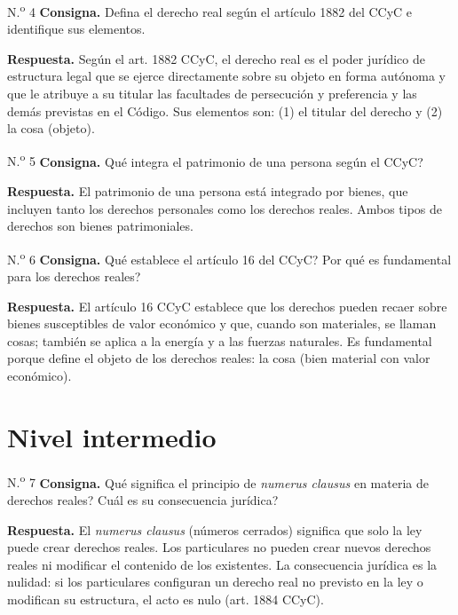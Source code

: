 \documentclass[12pt,oneside]{book}
\begin{document}
\begin{exercise}{N.\textsuperscript{o} 4}
\textbf{Consigna.} Defina el derecho real seg\'un el art\'iculo 1882 del CCyC e identifique sus elementos.

\textbf{Respuesta.} Seg\'un el art. 1882 CCyC, el derecho real es el poder jur\'idico de estructura legal que se ejerce directamente sobre su objeto en forma aut\'onoma y que le atribuye a su titular las facultades de persecuci\'on y preferencia y las dem\'as previstas en el C\'odigo. Sus elementos son: (1) el titular del derecho y (2) la cosa (objeto).
\end{exercise}

\begin{exercise}{N.\textsuperscript{o} 5}
\textbf{Consigna.} \textquestiondown Qu\'e integra el patrimonio de una persona seg\'un el CCyC?

\textbf{Respuesta.} El patrimonio de una persona est\'a integrado por bienes, que incluyen tanto los derechos personales como los derechos reales. Ambos tipos de derechos son bienes patrimoniales.
\end{exercise}

\begin{exercise}{N.\textsuperscript{o} 6}
\textbf{Consigna.} \textquestiondown Qu\'e establece el art\'iculo 16 del CCyC? \textquestiondown Por qu\'e es fundamental para los derechos reales?

\textbf{Respuesta.} El art\'iculo 16 CCyC establece que los derechos pueden recaer sobre bienes susceptibles de valor econ\'omico y que, cuando son materiales, se llaman cosas; tambi\'en se aplica a la energ\'ia y a las fuerzas naturales. Es fundamental porque define el objeto de los derechos reales: la cosa (bien material con valor econ\'omico).
\end{exercise}

\section{Nivel intermedio}

\begin{exercise}{N.\textsuperscript{o} 7}
\textbf{Consigna.} \textquestiondown Qu\'e significa el principio de \textit{numerus clausus} en materia de derechos reales? \textquestiondown Cu\'al es su consecuencia jur\'idica?

\textbf{Respuesta.} El \textit{numerus clausus} (n\'umeros cerrados) significa que solo la ley puede crear derechos reales. Los particulares no pueden crear nuevos derechos reales ni modificar el contenido de los existentes. La consecuencia jur\'idica es la nulidad: si los particulares configuran un derecho real no previsto en la ley o modifican su estructura, el acto es nulo (art. 1884 CCyC).
\end{exercise}
\end{document}
